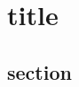 \documentclass[thesis.tex]{subfiles}
\begin{document}
\chapter{title}


\section{section}

\end{document}
